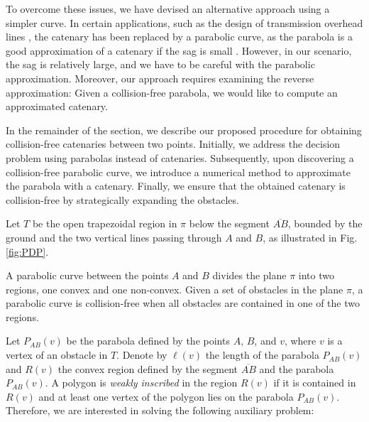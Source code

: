 To overcome these issues, we have devised an alternative approach using a simpler curve.  In certain applications, such as the design of transmission overhead lines \cite{hatibovic2018algorithm}, the catenary has been replaced by a parabolic curve, as the parabola is a good approximation of a catenary if the sag is small \cite{hatibovic2020comparison}. However, in our scenario, the sag is relatively large, and we have to be careful with the parabolic approximation.
Moreover, our approach requires examining the reverse approximation: Given a collision-free parabola, we would like to compute an approximated catenary.

In the remainder of the section, we describe our proposed procedure for obtaining collision-free catenaries between two points. Initially, we address the decision problem using parabolas instead of catenaries. Subsequently, upon discovering a collision-free parabolic curve, we introduce a numerical method to approximate the parabola with a catenary. Finally, we ensure that the obtained catenary %
is collision-free by strategically expanding the obstacles.

Let $T$ be the open trapezoidal region in $\pi$ below the segment $\overline{AB}$, bounded by the ground and the two vertical lines passing through $A$ and $B$, as illustrated in Fig. \ref{fig:PDP}.

A parabolic curve between the points $A$ and $B$ divides the plane $\pi$ into two regions, one convex and one non-convex. Given a set of obstacles in the plane $\pi$, a parabolic curve is collision-free when all obstacles are contained in one of the two regions.

Let $P_{AB}(v)$ be the parabola defined by the points $A$, $B$, and $v$, where $v$ is a vertex of an obstacle in $T$. Denote by $\ell(v)$ the length of the parabola $P_{AB}(v)$ and
$R(v)$ the convex region defined by the segment $\overline{AB}$ and the parabola $P_{AB}(v)$.
A polygon is \emph{weakly inscribed} in the region $R(v)$ if it is contained in $R(v)$
and at least one vertex of the polygon lies on the parabola $P_{AB}(v)$. 
Therefore, we are interested in solving the following auxiliary problem:

